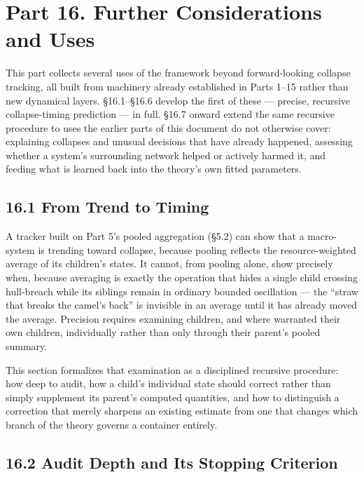 \documentclass[
]{article}
\begin{document}
\hypertarget{part-16.-further-considerations-and-uses}{%
\section{Part 16. Further Considerations and
Uses}\label{part-16.-further-considerations-and-uses}}

This part collects several uses of the framework beyond forward-looking
collapse tracking, all built from machinery already established in Parts
1--15 rather than new dynamical layers. §16.1--§16.6 develop the first
of these --- precise, recursive collapse-timing prediction --- in full.
§16.7 onward extend the same recursive procedure to uses the earlier
parts of this document do not otherwise cover: explaining collapses and
unusual decisions that have already happened, assessing whether a
system's surrounding network helped or actively harmed it, and feeding
what is learned back into the theory's own fitted parameters.

\hypertarget{from-trend-to-timing}{%
\subsection{16.1 From Trend to Timing}\label{from-trend-to-timing}}

A tracker built on Part 5's pooled aggregation (§5.2) can show that a
macro-system is trending toward collapse, because pooling reflects the
resource-weighted average of its children's states. It cannot, from
pooling alone, show precisely when, because averaging is exactly the
operation that hides a single child crossing hull-breach while its
siblings remain in ordinary bounded oscillation --- the ``straw that
breaks the camel's back'' is invisible in an average until it has
already moved the average. Precision requires examining children, and
where warranted their own children, individually rather than only
through their parent's pooled summary.

This section formalizes that examination as a disciplined recursive
procedure: how deep to audit, how a child's individual state should
correct rather than simply supplement its parent's computed quantities,
and how to distinguish a correction that merely sharpens an existing
estimate from one that changes which branch of the theory governs a
container entirely.

\hypertarget{audit-depth-and-its-stopping-criterion}{%
\subsection{16.2 Audit Depth and Its Stopping
Criterion}\label{audit-depth-and-its-stopping-criterion}}
\end{document}
